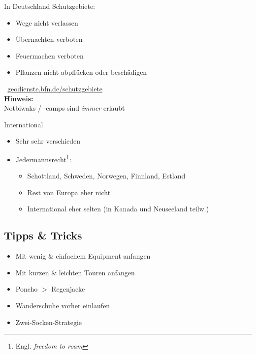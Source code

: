 \documentclass[aspectratio=169]{beamer}
\newcommand{\tipp}[2][Tipp]{\vspace{0.2cm}\textbf{#1:}\\#2}
\begin{document}
			\begin{frame}{In Deutschland}
				Schutzgebiete:
				\begin{itemize}
					\item Wege nicht verlassen
					\item Übernachten verboten
					\item Feuermachen verboten
					\item Pflanzen nicht abpflücken oder beschädigen
				\end{itemize}
				\vspace{0.2cm}
				\textcolor{blue}{\textrightarrow}\ \href{https://geodienste.bfn.de/schutzgebiete}{geodienste.bfn.de/schutzgebiete}\\
				\pause
				\vspace{0.2cm}
				\tipp[Hinweis]{Notbiwaks / -camps sind \textit{immer} erlaubt}
			\end{frame}
			
			\begin{frame}{International}
				\begin{itemize}
					\item Sehr sehr verschieden
					\item Jedermannsrecht\footnote{Engl. \textit{freedom to roam}}:
					\begin{itemize}
						\item Schottland, Schweden, Norwegen, Finnland, Estland
						\item Rest von Europa eher nicht
						\item International eher selten (in Kanada und Neuseeland teilw.)
					\end{itemize}
				\end{itemize}
			\end{frame}
%		
		\subsection{Tipps \& Tricks}
		
			\begin{frame}{}
				\begin{itemize}
					\item Mit wenig \& einfachem Equipment anfangen
					\item Mit kurzen \& leichten Touren anfangen
					\item Poncho $>$ Regenjacke
					\item Wanderschuhe vorher einlaufen
					\item Zwei-Socken-Strategie
				\end{itemize}
			\end{frame}
		
		{
			\frame{}
		}
\end{document}
